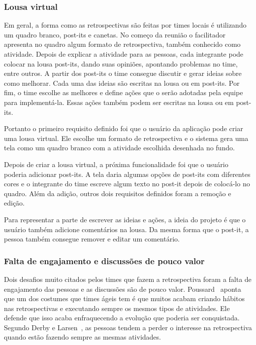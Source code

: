 \subsubsection*{Lousa virtual}

Em geral, a forma como as retrospectivas são feitas por times locais é utilizando um quadro branco, post-its e canetas. No começo da reunião o facilitador apresenta no quadro algum formato de retrospectiva, também conhecido como atividade. Depois de explicar a atividade para as pessoas, cada integrante pode colocar na lousa post-its, dando suas opiniões, apontando problemas no time, entre outros. A partir dos post-its o time consegue discutir e gerar ideias sobre como melhorar. Cada uma das ideias são escritas na lousa ou em post-its. Por fim, o time escolhe as melhores e define ações que o serão adotadas pela equipe para implementá-la. Essas ações também podem ser escritas na lousa ou em post-its.

Portanto o primeiro requisito definido foi que o usuário da aplicação pode criar uma lousa virtual. Ele escolhe um formato de retrospectiva e o sistema gera uma tela como um quadro branco com a atividade escolhida desenhada no fundo.

Depois de criar a lousa virtual, a próxima funcionalidade foi que o usuário poderia adicionar post-its. A tela daria algumas opções de post-its com diferentes cores e o integrante do time escreve algum texto no post-it depois de colocá-lo no quadro. Além da adição, outros dois requisitos definidos foram a remoção e edição.

Para representar a parte de escrever as ideias e ações, a ideia do projeto é que o usuário também adicione comentários na lousa. Da mesma forma que o post-it, a pessoa também consegue remover e editar um comentário.

\subsubsection*{Falta de engajamento e discussões de pouco valor}

Dois desafios muito citados pelos times que fazem a retrospectiva foram a falta de engajamento das pessoas e as discussões são de pouco valor. Poussard~\cite{poussard} aponta que um dos costumes que times ágeis tem é que muitos acabam criando hábitos nas retrospectivas e executando sempre os mesmos tipos de atividades. Ele defende que isso acaba enfraquecendo a evolução que poderia ser conquistada. Segundo Derby e Larsen~\cite{retrospectives},  as pessoas tendem a perder o interesse na retrospectiva quando estão fazendo sempre as mesmas atividades.


